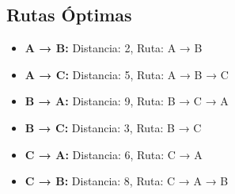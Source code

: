 \documentclass[12pt]{article}
\begin{document}
\clearpage
\subsection{Rutas Óptimas}
\begin{itemize}
\item \textbf{A → B:} Distancia: 2, Ruta: A → B
\item \textbf{A → C:} Distancia: 5, Ruta: A → B → C
\item \textbf{B → A:} Distancia: 9, Ruta: B → C → A
\item \textbf{B → C:} Distancia: 3, Ruta: B → C
\item \textbf{C → A:} Distancia: 6, Ruta: C → A
\item \textbf{C → B:} Distancia: 8, Ruta: C → A → B
\end{itemize}
\end{document}
